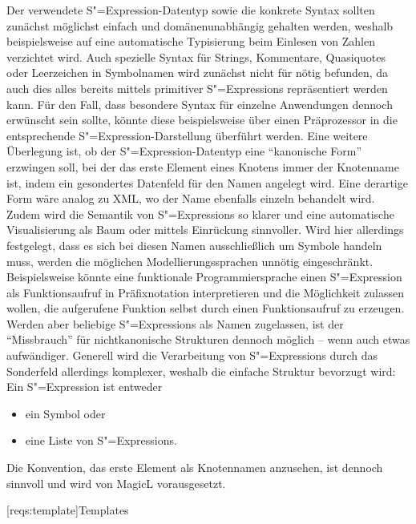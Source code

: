 \documentclass[11pt, a4paper, bibgerm]{scrbook}
\newcommand\lsection{}
\newcommand{\sexp}{S"=Expression}
\newcommand{\sexps}{S"=Expressions}
\begin{document}
Der verwendete \sexp{}-Datentyp sowie die konkrete Syntax sollten
zunächst möglichst einfach und domänenunabhängig gehalten werden,
weshalb beispielsweise auf eine automatische Typisierung beim Einlesen
von Zahlen verzichtet wird. Auch spezielle Syntax für Strings,
Kommentare, Quasiquotes oder Leerzeichen in Symbolnamen wird zunächst
nicht für nötig befunden, da auch dies alles bereits mittels primitiver
\sexps{} repräsentiert werden kann. Für den Fall, dass besondere Syntax
für einzelne Anwendungen dennoch erwünscht sein sollte, könnte diese
beispielsweise über einen Präprozessor in die entsprechende
\sexp{}-Darstellung überführt werden. Eine weitere Überlegung ist, ob der
\sexp{}-Datentyp eine "`kanonische Form"' erzwingen soll, bei der das
erste Element eines Knotens immer der Knotenname ist, indem ein
gesondertes Datenfeld für den Namen angelegt wird. Eine derartige Form
wäre analog zu XML, wo der Name ebenfalls einzeln behandelt wird. Zudem
wird die Semantik von \sexps{} so klarer und eine automatische
Visualisierung als Baum oder mittels Einrückung sinnvoller.  Wird hier
allerdings festgelegt, dass es sich bei diesen Namen ausschließlich um
Symbole handeln muss, werden die möglichen Modellierungssprachen unnötig
eingeschränkt. Beispielsweise könnte eine funktionale Programmiersprache
einen \sexp{} als Funktionsaufruf in Präfixnotation interpretieren und
die Möglichkeit zulassen wollen, die aufgerufene Funktion selbst durch
einen Funktionsaufruf zu erzeugen. Werden aber beliebige \sexps{} als
Namen zugelassen, ist der "`Missbrauch"' für nichtkanonische Strukturen
dennoch möglich -- wenn auch etwas aufwändiger. Generell wird die
Verarbeitung von \sexps{} durch das Sonderfeld allerdings komplexer,
weshalb die einfache Struktur bevorzugt wird: Ein \sexp{} ist entweder 
\begin{itemize}
\item ein Symbol oder 
\item eine Liste von \sexps{}.
\end{itemize}
Die Konvention, das erste Element als Knotennamen anzusehen, ist dennoch
sinnvoll und wird von MagicL vorausgesetzt.

\lsection[reqs:template]{Templates}
\end{document}
